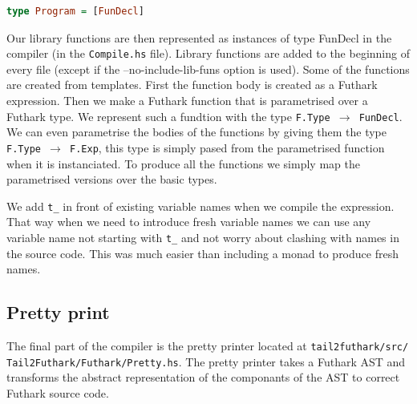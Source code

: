 \documentclass[11pt]{article}
\begin{document}
\begin{lstlisting}[language=haskell]
type Program = [FunDecl]
\end{lstlisting}

Our library functions are then represented as instances of type FunDecl in the compiler (in the {\tt Compile.hs} file).
Library functions are added to the beginning of every file (except if the --no-include-lib-funs option is used). 
Some of the functions are created from templates. First the function body is created as a Futhark expression. Then we make a Futhark function that is parametrised over a Futhark type. We represent such a fundtion with the type {\tt F.Type $\rightarrow$ FunDecl}. We can even parametrise the bodies of the functions by giving them the type {\tt F.Type $\rightarrow$ F.Exp}, this type is simply pased from the parametrised function when it is instanciated. To produce all the functions we simply map the parametrised versions over the basic types. 

We add {\tt t\_} in front of existing variable names when we compile the expression. That way when we need to introduce fresh variable names we can use any variable name not starting with {\tt t\_} and not worry about clashing with names in the source code. This was much easier than including a monad to produce fresh names. 



\subsection{Pretty print}
The final part of the compiler is the pretty printer located at {\tt tail2futhark/src/
Tail2Futhark/Futhark/Pretty.hs}. 
The pretty printer takes a Futhark AST and transforms the abstract representation of the componants of the AST to correct Futhark source code. 
\end{document}
